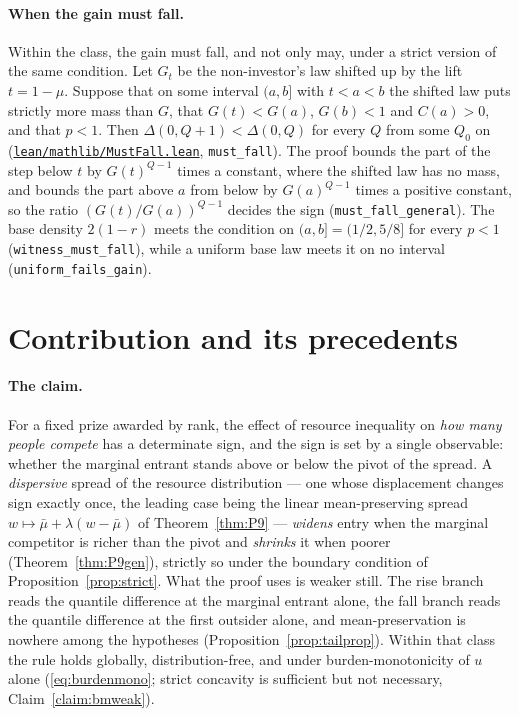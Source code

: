 \documentclass[11pt]{article}
\newcommand{\file}[1]{\href{run:#1}{\texttt{#1}}}
\begin{document}
\paragraph{When the gain must fall.} Within the class, the gain must fall, and
not only may, under a strict version of the same condition. Let $G_t$ be the
non-investor's law shifted up by the lift $t=1-\mu$. Suppose that on some
interval $(a,b]$ with $t<a<b$ the shifted law puts strictly more mass than
$G$, that $G(t)<G(a)$, $G(b)<1$ and $C(a)>0$, and that $p<1$. Then
$\Delta(0,Q{+}1)<\Delta(0,Q)$ for every $Q$ from some $Q_0$ on
(\file{lean/mathlib/MustFall.lean}, \texttt{must\_fall}). The proof bounds the
part of the step below $t$ by $G(t)^{Q-1}$ times a constant, where the shifted
law has no mass, and bounds the part above $a$ from below by $G(a)^{Q-1}$
times a positive constant, so the ratio $(G(t)/G(a))^{Q-1}$ decides the sign
(\texttt{must\_fall\_general}). The base density $2(1-r)$ meets the condition
on $(a,b]=(1/2,5/8]$ for every $p<1$ (\texttt{witness\_must\_fall}), while a
uniform base law meets it on no interval (\texttt{uniform\_fails\_gain}).

\section{Contribution and its precedents}
\label{sec:contribution}

\paragraph{The claim.} For a fixed prize awarded by rank, the effect of
resource inequality on \emph{how many people compete} has a determinate sign,
and the sign is set by a single observable: whether the marginal entrant
stands above or below the pivot of the spread. A \emph{dispersive} spread of
the resource distribution --- one whose displacement changes sign exactly
once, the leading case being the linear mean-preserving spread
$w\mapsto\bar\mu+\lambda(w-\bar\mu)$ of Theorem~\ref{thm:P9} ---
\emph{widens} entry when the marginal competitor is richer than the pivot and
\emph{shrinks} it when poorer (Theorem~\ref{thm:P9gen}), strictly so under the
boundary condition of Proposition~\ref{prop:strict}. What the proof uses is
weaker still. The rise branch reads the quantile difference at the marginal
entrant alone, the fall branch reads the quantile difference at the first
outsider alone, and mean-preservation is nowhere among the hypotheses
(Proposition~\ref{prop:tailprop}). Within that class the rule holds globally,
distribution-free, and under burden-monotonicity of $u$ alone
(\eqref{eq:burdenmono}; strict concavity is sufficient but not necessary,
Claim~\ref{claim:bmweak}).
\end{document}
